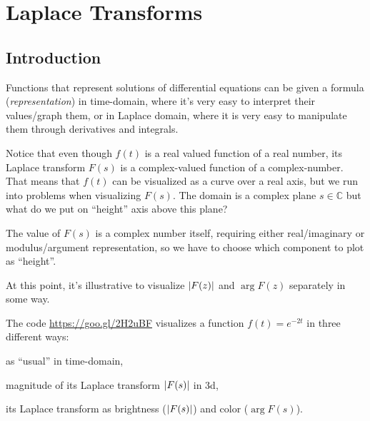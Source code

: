 \chapter{Laplace Transforms}
\section{Introduction}
\begin{weekintro}
  \begin{fullwidth}
  Functions that represent solutions of differential equations can be given a formula (\emph{representation}) in time-domain,
  where it's very easy to interpret their values/graph them, or in  Laplace domain,
  where it is very easy to manipulate them through derivatives and integrals.

  Notice that even though \(f(t)\) is a real valued function of a real number, its Laplace transform \(F(s)\)
  is a complex-valued function of a complex-number. 
  That means that \(f(t)\) can be visualized as a curve over a real axis, but we run into
  problems when visualizing \(F(s)\).
  The domain is a complex plane \(s \in \mathbb{C}\) but what do we put on ``height'' axis above this plane?

  The value of \(F(s)\) is a complex number itself, requiring either real/imaginary or modulus/argument representation, so we have to choose
  which component to plot as ``height''.
  
  At this point, it's illustrative to visualize \(\lvert F(z)\rvert\) and \(\arg F(z)\) separately in some way.

  The \sage code \url{https://goo.gl/2H2uBF} visualizes a function \(f(t) = e^{-2t}\) in three different ways:
  \begin{inparaenum}[(i)]
  \item as ``usual'' in time-domain,
  \item magnitude of its Laplace transform \(\lvert F(s)\rvert\) in 3d,
  \item its Laplace transform as brightness (\(\lvert F(s)\rvert\)) and color (\(\arg F(s)\)).
  \end{inparaenum}


\end{fullwidth}
\end{weekintro}
